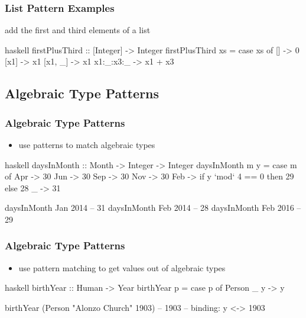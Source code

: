 \documentclass[dvipsnames]{beamer}
\theoremstyle{plain}
\begin{document}
\begin{frame}[fragile]
  \frametitle{List Pattern Examples}

  \begin{exampleblock}{add the first and third elements of a list}
    \begin{pygments}{haskell}
firstPlusThird :: [Integer] -> Integer
firstPlusThird xs =
    case xs of
      []        -> 0
      [x1]      -> x1
      [x1, _]   -> x1
      x1:_:x3:_ -> x1 + x3
    \end{pygments}
  \end{exampleblock}
\end{frame}

\subsection{Algebraic Type Patterns}

\begin{frame}[fragile]
  \frametitle{Algebraic Type Patterns}

  \begin{itemize}
    \item use patterns to match algebraic types
  \end{itemize}

  \begin{exampleblock}{}
    \begin{pygments}{haskell}
daysInMonth :: Month -> Integer -> Integer
daysInMonth m y =
    case m of
      Apr -> 30
      Jun -> 30
      Sep -> 30
      Nov -> 30
      Feb -> if y `mod` 4 == 0 then 29 else 28
      _   -> 31

daysInMonth Jan 2014 -- 31
daysInMonth Feb 2014 -- 28
daysInMonth Feb 2016 -- 29
    \end{pygments}
  \end{exampleblock}
\end{frame}

\begin{frame}[fragile]
  \frametitle{Algebraic Type Patterns}

  \begin{itemize}
    \item use pattern matching to get values out of algebraic types
  \end{itemize}

  \begin{exampleblock}{}
    \begin{pygments}{haskell}
birthYear :: Human -> Year
birthYear p =
    case p of
      Person _ y -> y

birthYear (Person "Alonzo Church" 1903)  -- 1903
-- binding: y <-> 1903
    \end{pygments}
  \end{exampleblock}
\end{frame}
\end{document}

